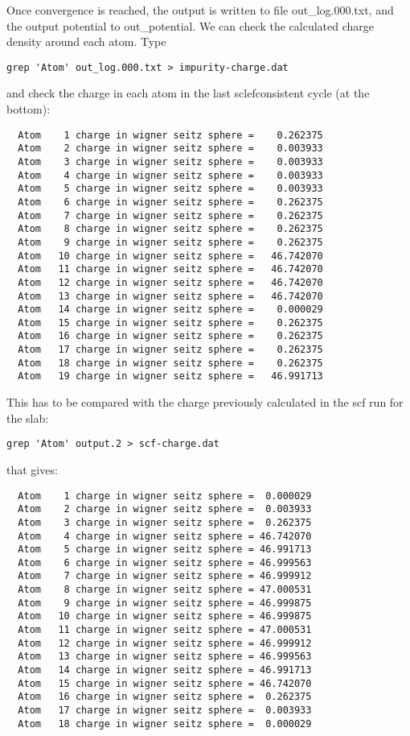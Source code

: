 \documentclass[11pt,fleqn]{book} %
\begin{document}
Once convergence is reached, the output is written to
file out\_log.000.txt, and the output potential
to out\_potential.
We can check the calculated charge density around each atom.
Type
\begin{VBox}
\begin{verbatim}
grep 'Atom' out_log.000.txt > impurity-charge.dat
\end{verbatim}
\end{VBox}
and check the charge in each atom in the last sclefconsistent cycle (at the bottom):
\begin{VBox}
\begin{verbatim}
  Atom    1 charge in wigner seitz sphere =    0.262375
  Atom    2 charge in wigner seitz sphere =    0.003933
  Atom    3 charge in wigner seitz sphere =    0.003933
  Atom    4 charge in wigner seitz sphere =    0.003933
  Atom    5 charge in wigner seitz sphere =    0.003933
  Atom    6 charge in wigner seitz sphere =    0.262375
  Atom    7 charge in wigner seitz sphere =    0.262375
  Atom    8 charge in wigner seitz sphere =    0.262375
  Atom    9 charge in wigner seitz sphere =    0.262375
  Atom   10 charge in wigner seitz sphere =   46.742070
  Atom   11 charge in wigner seitz sphere =   46.742070
  Atom   12 charge in wigner seitz sphere =   46.742070
  Atom   13 charge in wigner seitz sphere =   46.742070
  Atom   14 charge in wigner seitz sphere =    0.000029
  Atom   15 charge in wigner seitz sphere =    0.262375
  Atom   16 charge in wigner seitz sphere =    0.262375
  Atom   17 charge in wigner seitz sphere =    0.262375
  Atom   18 charge in wigner seitz sphere =    0.262375
  Atom   19 charge in wigner seitz sphere =   46.991713
\end{verbatim}
\end{VBox}
This has to be compared with the charge previously calculated in the scf run for the slab:
\begin{VBox}
\begin{verbatim}
grep 'Atom' output.2 > scf-charge.dat
\end{verbatim}
\end{VBox}
that gives:
\begin{VBox}
\begin{verbatim}
  Atom    1 charge in wigner seitz sphere =  0.000029
  Atom    2 charge in wigner seitz sphere =  0.003933
  Atom    3 charge in wigner seitz sphere =  0.262375
  Atom    4 charge in wigner seitz sphere = 46.742070
  Atom    5 charge in wigner seitz sphere = 46.991713
  Atom    6 charge in wigner seitz sphere = 46.999563
  Atom    7 charge in wigner seitz sphere = 46.999912
  Atom    8 charge in wigner seitz sphere = 47.000531
  Atom    9 charge in wigner seitz sphere = 46.999875
  Atom   10 charge in wigner seitz sphere = 46.999875
  Atom   11 charge in wigner seitz sphere = 47.000531
  Atom   12 charge in wigner seitz sphere = 46.999912
  Atom   13 charge in wigner seitz sphere = 46.999563
  Atom   14 charge in wigner seitz sphere = 46.991713
  Atom   15 charge in wigner seitz sphere = 46.742070
  Atom   16 charge in wigner seitz sphere =  0.262375
  Atom   17 charge in wigner seitz sphere =  0.003933
  Atom   18 charge in wigner seitz sphere =  0.000029
\end{verbatim}
\end{VBox}
\end{document}
